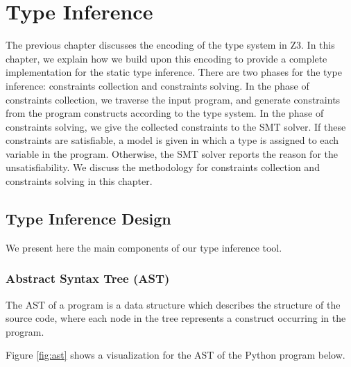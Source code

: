 
\chapter{Type Inference}\label{chapter:ti}
The previous chapter discusses the encoding of the type system in Z3. In this chapter, we explain how we build upon this encoding to provide a complete implementation for the static type inference. There are two phases for the type inference: constraints collection and constraints solving. In the phase of constraints collection, we traverse the input program, and generate constraints from the program constructs according to the type system. In the phase of constraints solving, we give the collected constraints to the SMT solver. If these constraints are satisfiable, a model is given in which a type is assigned to each variable in the program. Otherwise, the SMT solver reports the reason for the unsatisfiability. We discuss the methodology for constraints collection and constraints solving in this chapter.

\section{Type Inference Design}
We present here the main components of our type inference tool.
\subsection{Abstract Syntax Tree (AST)}
The AST of a program is a data structure which describes the structure of the source code, where each node in the tree represents a construct occurring in the program.

Figure \ref{fig:ast} shows a visualization for the AST of the Python program below.


